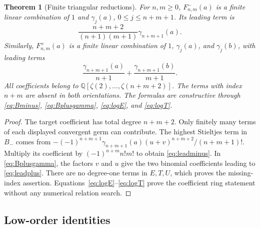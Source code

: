 \documentclass[11pt]{article}
\numberwithin{equation}{section}
\newtheorem{theorem}{Theorem}[section]
\theoremstyle{definition}\newtheorem{definition}[theorem]{Definition}
\theoremstyle{remark}\newtheorem{remark}[theorem]{Remark}
\newcommand{\Q}{\mathbb Q}\newcommand{\T}{\mathbb T}
\begin{document}
\begin{theorem}[Finite triangular reductions]\label{thm:triangular}
For $n,m\ge0$, $F^-_{n,m}(a)$ is a finite linear combination of $1$ and
$\gamma_j(a)$, $0\le j\le n+m+1$. Its leading term is
\begin{equation}\label{eq:leadminus}
 \frac{n+m+2}{(n+1)(m+1)}\gamma_{n+m+1}(a).
\end{equation}
Similarly, $F^+_{n,m}(a)$ is a finite linear combination of $1$,
$\gamma_j(a)$, and $\gamma_j(b)$, with leading terms
\begin{equation}\label{eq:leadplus}
 \frac{\gamma_{n+m+1}(a)}{n+1}
 +\frac{\gamma_{n+m+1}(b)}{m+1}.
\end{equation}
All coefficients belong to $\Q[\zeta(2),\ldots,\zeta(n+m+2)]$.
The terms with index $n+m$ are absent in both orientations. The formulas
are constructive through \eqref{eq:Bminus}, \eqref{eq:Bplusgamma},
\eqref{eq:logE}, and \eqref{eq:logT}.
\end{theorem}
\begin{proof}
The target coefficient has total degree $n+m+2$. Only finitely many
terms of each displayed convergent germ can contribute. The highest
Stieltjes term in $B_-$ comes from
$-(-1)^{n+m+1}\gamma_{n+m+1}(a)(u+v)^{n+m+2}/(n+m+1)!$.
Multiply its coefficient by $(-1)^{n+m}n!m!$ to obtain
\eqref{eq:leadminus}. In \eqref{eq:Bplusgamma}, the factors $v$ and $u$
give the two binomial coefficients leading to \eqref{eq:leadplus}.
There are no degree-one terms in $E,T,U$, which proves the missing-index
assertion. Equations~\eqref{eq:logE}--\eqref{eq:logT} prove the coefficient
ring statement without any numerical relation search.
\end{proof}

\subsection{Low-order identities}
\end{document}
